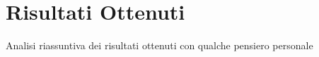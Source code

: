 \section{Risultati Ottenuti}
Analisi riassuntiva dei risultati ottenuti con qualche pensiero
personale